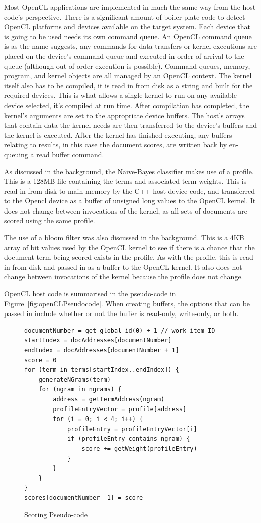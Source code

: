 Most OpenCL applications are implemented in much the same way from the host
code's perspective. There is a significant amount of boiler plate code to detect
OpenCL platforms and devices available on the target system. Each device that is
going to be used needs its own command queue. An OpenCL command queue is as the
name suggests, any commands for data transfers or kernel executions are placed
on the device's command queue and executed in order of arrival to the queue
(although out of order execution is possible). Command queues, memory, program,
and kernel objects are all managed by an OpenCL context. The kernel itself also
has to be compiled, it is read in from disk as a string and built for the
required devices. This is what allows a single kernel to run on any available
device selected, it's compiled at run time. After compilation has completed, the
kernel's arguments are set to the appropriate device buffers. The host's arrays
that contain data the kernel needs are then transferred to the device's buffers
and the kernel is executed. After the kernel has finished executing, any buffers
relating to results, in this case the document scores, are written back by en-
queuing a read buffer command.

As discussed in the background, the Na{\"{\i}}ve-Bayes classifier makes use of a
profile. This is a 128MB file containing the terms and associated term weights.
This is read in from disk to main memory by the C++ host device code, and
transferred to the Opencl device as a buffer of unsigned long values to the
OpenCL kernel. It does not change between invocations of the kernel, as all sets
of documents are scored using the same profile.

The use of a bloom filter was also discussed in the background. This is a 4KB
array of bit values used by the OpenCL kernel to see if there is a chance that
the document term being scored exists in the profile. As with the profile, this
is read in from disk and passed in as a buffer to the OpenCL kernel. It also
does not change between invocations of the kernel because the profile does not
change.

OpenCL host code is summarised in the pseudo-code in
Figure~\ref{fig:openCLPseudocode}. When creating buffers, the options that can be
passed in include whether or not the buffer is read-only, write-only, or both.

\begin{figure}[H]
\small\begin{verbatim}
documentNumber = get_global_id(0) + 1 // work item ID
startIndex = docAddresses[documentNumber]
endIndex = docAddresses[documentNumber + 1]
score = 0
for (term in terms[startIndex..endIndex]) {
    generateNGrams(term)
    for (ngram in ngrams) {
        address = getTermAddress(ngram)
        profileEntryVector = profile[address]
        for (i = 0; i < 4; i++) {
            profileEntry = profileEntryVector[i]
            if (profileEntry contains ngram) {
                score += getWeight(profileEntry)
            }
        }
    }
}
scores[documentNumber -1] = score
\end{verbatim}
\caption{Scoring Pseudo-code}
\label{fig:scoringPseudocode}
\end{figure}

